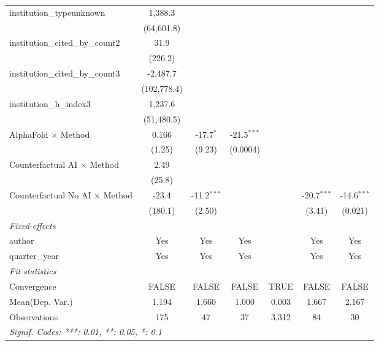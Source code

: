 \begin{tabular}{lcccccc}
   institution\_typeunknown              & 1,388.3     &               &               &       &               &   \\   
                                         & (64,601.8)  &               &               &       &               &   \\   
   institution\_cited\_by\_count2        & 31.9        &               &               &       &               &   \\   
                                         & (226.2)     &               &               &       &               &   \\   
   institution\_cited\_by\_count3        & -2,487.7    &               &               &       &               &   \\   
                                         & (102,778.4) &               &               &       &               &   \\   
   institution\_h\_index3                & 1,237.6     &               &               &       &               &   \\   
                                         & (51,480.5)  &               &               &       &               &   \\   
   AlphaFold $\times$ Method             & 0.166       & -17.7$^{*}$   & -21.5$^{***}$ &       &               &   \\   
                                         & (1.25)      & (9.23)        & (0.0004)      &       &               &   \\   
   Counterfactual AI $\times$ Method     & 2.49        &               &               &       &               &   \\   
                                         & (25.8)      &               &               &       &               &   \\   
   Counterfactual No AI $\times$ Method  & -23.4       & -11.2$^{***}$ &               &       & -20.7$^{***}$ & -14.6$^{***}$\\   
                                         & (180.1)     & (2.50)        &               &       & (3.41)        & (0.021)\\   
   \midrule
   \emph{Fixed-effects}\\
   author                                & Yes         & Yes           & Yes           &       & Yes           & Yes\\  
   quarter\_year                         & Yes         & Yes           & Yes           &       & Yes           & Yes\\  
   \midrule
   \emph{Fit statistics}\\
   Convergence                           &FALSE        & FALSE         & FALSE         & TRUE  & FALSE         & FALSE\\  
Mean(Dep. Var.) & 1.194 & 1.660 & 1.000 & 0.003 & 1.667 & 2.167 \\
   Observations                          & 175         & 47            & 37            & 3,312 & 84            & 30\\  
   \midrule \midrule
   \multicolumn{7}{l}{\emph{Signif. Codes: ***: 0.01, **: 0.05, *: 0.1}}\\
\end{tabular}
\par\endgroup
